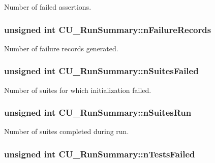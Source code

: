 Number of failed assertions. 

\hypertarget{struct_c_u___run_summary_a1a2d40200bf4a3f15fd94f4f0e1faa40}{
\subsubsection[{n\+Failure\+Records}]{\setlength{\rightskip}{0pt plus 5cm}unsigned int C\+U\+\_\+\+Run\+Summary\+::n\+Failure\+Records}}\label{struct_c_u___run_summary_a1a2d40200bf4a3f15fd94f4f0e1faa40}


Number of failure records generated. 

\hypertarget{struct_c_u___run_summary_a7ef012ea5105cd86ff16bf131f1d0ac2}{
\subsubsection[{n\+Suites\+Failed}]{\setlength{\rightskip}{0pt plus 5cm}unsigned int C\+U\+\_\+\+Run\+Summary\+::n\+Suites\+Failed}}\label{struct_c_u___run_summary_a7ef012ea5105cd86ff16bf131f1d0ac2}


Number of suites for which initialization failed. 

\hypertarget{struct_c_u___run_summary_ae426617945d15652562f4d2b5d243f51}{
\subsubsection[{n\+Suites\+Run}]{\setlength{\rightskip}{0pt plus 5cm}unsigned int C\+U\+\_\+\+Run\+Summary\+::n\+Suites\+Run}}\label{struct_c_u___run_summary_ae426617945d15652562f4d2b5d243f51}


Number of suites completed during run. 

\hypertarget{struct_c_u___run_summary_a3a3be4dfb55ceffdb2ffacdac9796d24}{
\subsubsection[{n\+Tests\+Failed}]{\setlength{\rightskip}{0pt plus 5cm}unsigned int C\+U\+\_\+\+Run\+Summary\+::n\+Tests\+Failed}}\label{struct_c_u___run_summary_a3a3be4dfb55ceffdb2ffacdac9796d24}


